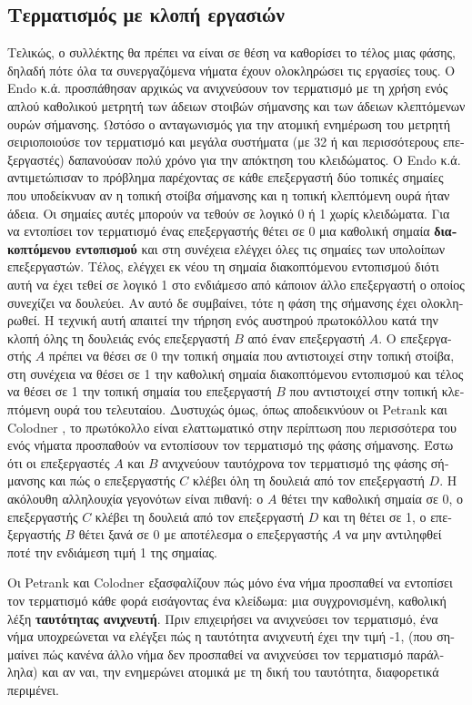 \begin{greek}
\subsection{Τερματισμός με κλοπή εργασιών}
Τελικώς, ο συλλέκτης θα πρέπει να είναι σε θέση να καθορίσει
το τέλος μιας φάσης, δηλαδή πότε όλα τα συνεργαζόμενα νήματα
έχουν ολοκληρώσει τις εργασίες τους. Ο Endo κ.ά. \cite{DBLP:conf/sc/EndoTY97}
προσπάθησαν αρχικώς να ανιχνεύσουν τον τερματισμό με τη χρήση
ενός απλού καθολικού μετρητή των άδειων στοιβών σήμανσης και
των άδειων κλεπτόμενων ουρών σήμανσης. Ωστόσο ο ανταγωνισμός
για την ατομική ενημέρωση του μετρητή σειριοποιούσε τον τερματισμό
και μεγάλα συστήματα (με 32 ή και περισσότερους επεξεργαστές)
δαπανούσαν πολύ χρόνο για την απόκτηση του κλειδώματος.
O Endo κ.ά. αντιμετώπισαν το πρόβλημα παρέχοντας σε κάθε επεξεργαστή
δύο τοπικές σημαίες που υποδείκνυαν αν η τοπική στοίβα σήμανσης
και η τοπική κλεπτόμενη ουρά ήταν άδεια. Οι σημαίες αυτές
μπορούν να τεθούν σε λογικό 0 ή 1 χωρίς κλειδώματα. Για να
εντοπίσει τον τερματισμό ένας επεξεργαστής θέτει σε 0 μια
καθολική σημαία \textbf{διακοπτόμενου εντοπισμού} και στη
συνέχεια ελέγχει όλες τις σημαίες των υπολοίπων επεξεργαστών.
Τέλος, ελέγχει εκ νέου τη σημαία διακοπτόμενου εντοπισμού
διότι αυτή να έχει τεθεί σε λογικό 1 στο ενδιάμεσο από κάποιον
άλλο επεξεργαστή ο οποίος συνεχίζει να δουλεύει. Αν αυτό
δε συμβαίνει, τότε η φάση της σήμανσης έχει ολοκληρωθεί.
Η τεχνική αυτή απαιτεί την τήρηση ενός αυστηρού πρωτοκόλλου
κατά την κλοπή όλης τη δουλειάς ενός επεξεργαστή  $B$ από
έναν επεξεργαστή $A$. Ο επεξεργαστής $A$ πρέπει να θέσει σε
0 την τοπική σημαία που αντιστοιχεί στην τοπική στοίβα, στη
συνέχεια να θέσει σε 1 την καθολική σημαία διακοπτόμενου
εντοπισμού και τέλος να θέσει σε 1 την τοπική σημαία του
επεξεργαστή $B$ που αντιστοιχεί στην τοπική κλεπτόμενη ουρά
του τελευταίου. Δυστυχώς όμως, όπως αποδεικνύουν οι Petrank
και Colodner \cite{DBLP:journals/ppl/PetrankK04}, το πρωτόκολλο
είναι ελαττωματικό στην περίπτωση που περισσότερα του ενός
νήματα προσπαθούν να εντοπίσουν τον τερματισμό της φάσης
σήμανσης. Έστω ότι οι επεξεργαστές $A$ και $B$ ανιχνεύουν
ταυτόχρονα τον τερματισμό της φάσης σήμανσης και πώς ο επεξεργαστής
$C$ κλέβει όλη τη δουλειά από τον επεξεργαστή $D$. Η ακόλουθη
αλληλουχία γεγονότων είναι πιθανή: ο $A$ θέτει την καθολική
σημαία σε 0, ο επεξεργαστής $C$ κλέβει τη δουλειά από τον επεξεργαστή
$D$ και τη θέτει σε 1, ο επεξεργαστής $B$ θέτει ξανά σε 0
με αποτέλεσμα ο επεξεργαστής $A$ να μην αντιληφθεί ποτέ την
ενδιάμεση τιμή 1 της σημαίας.

Οι Petrank και Colodner \cite{DBLP:journals/ppl/PetrankK04}
εξασφαλίζουν πώς μόνο ένα νήμα προσπαθεί να εντοπίσει τον
τερματισμό κάθε φορά εισάγοντας ένα κλείδωμα: μια συγχρονισμένη,
καθολική λέξη \textbf{ταυτότητας ανιχνευτή}. Πριν επιχειρήσει
να ανιχνεύσει τον τερματισμό, ένα νήμα υποχρεώνεται να ελέγξει
πώς η ταυτότητα ανιχνευτή έχει την τιμή -1, (που σημαίνει πώς
κανένα άλλο νήμα δεν προσπαθεί να ανιχνεύσει τον τερματισμό
παράλληλα) και αν ναι, την ενημερώνει ατομικά με τη δική του
ταυτότητα, διαφορετικά περιμένει.


\end{greek}
